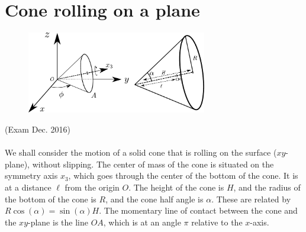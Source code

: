 \documentclass{article}
\begin{document}
    \section{Cone rolling on a plane}
        \begin{figure}
            \centering
            \includegraphics[width=0.7\textwidth]{figures/exercise_7_3_cone.pdf}
        \end{figure} 
        (Exam Dec. 2016) \\ \\
        We shall consider the motion of a solid cone that is rolling on the surface ($xy$-plane), without slipping. The center of mass of the cone is situated on the symmetry axis $x_3$, which goes through the center of the bottom of the cone. It is at a distance $\ell$ from the origin $O$. The height of the cone is $H$, and the radius of the bottom of the cone is $R$, and the cone half angle is $\alpha$. These are related by $R\cos(\alpha) = \sin(\alpha)  H$. The momentary line of contact between the cone and the $xy$-plane is the line $OA$, which is at an angle $\pi$ relative to the $x$-axis.
\end{document}
